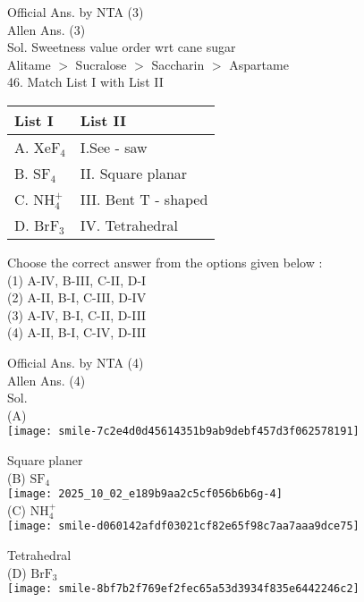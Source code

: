 \documentclass[10pt]{article}
\begin{document}
Official Ans. by NTA (3)\\
Allen Ans. (3)\\
Sol. Sweetness value order wrt cane sugar\\
Alitame \(>\) Sucralose \(>\) Saccharin \(>\) Aspartame\\
46. Match List I with List II

\begin{center}
\begin{tabular}{|l|l|}
\hline
List I & List II \\
\hline
A. \(\mathrm{XeF}_{4}\) & I.See - saw \\
\hline
B. \(\mathrm{SF}_{4}\) & II. Square planar \\
\hline
C. \(\mathrm{NH}_{4}^{+}\) & III. Bent T - shaped \\
\hline
D. \(\mathrm{BrF}_{3}\) & IV. Tetrahedral \\
\hline
\end{tabular}
\end{center}

Choose the correct answer from the options given below :\\
(1) A-IV, B-III, C-II, D-I\\
(2) A-II, B-I, C-III, D-IV\\
(3) A-IV, B-I, C-II, D-III\\
(4) A-II, B-I, C-IV, D-III

Official Ans. by NTA (4)\\
Allen Ans. (4)\\
Sol.\\
(A)\\
\texttt{[image: smile-7c2e4d0d45614351b9ab9debf457d3f062578191]}

Square planer\\
(B) \(\mathrm{SF}_{4}\)\\
\texttt{[image: 2025\_10\_02\_e189b9aa2c5cf056b6b6g-4]}\\
(C) \(\mathrm{NH}_{4}^{+}\)\\
\texttt{[image: smile-d060142afdf03021cf82e65f98c7aa7aaa9dce75]}

Tetrahedral\\
(D) \(\mathrm{Br} \mathrm{F}_{3}\)\\
\texttt{[image: smile-8bf7b2f769ef2fec65a53d3934f835e6442246c2]}
\end{document}
